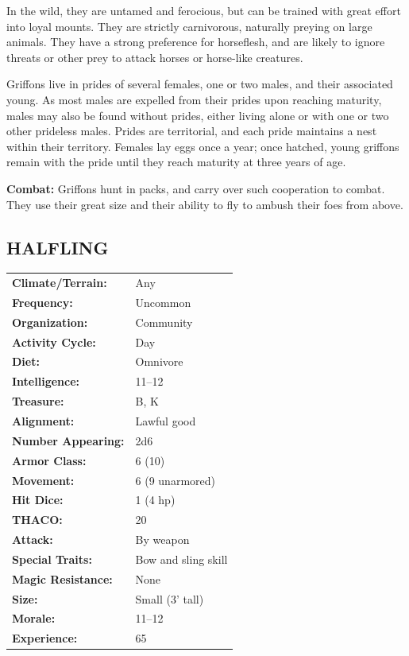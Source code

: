 \begin{multicols}{2}
In the wild, they are untamed and ferocious, but can be trained with great effort into loyal mounts. They are strictly carnivorous, naturally preying on large animals. They have a strong preference for horseflesh, and are likely to ignore threats or other prey to attack horses or horse-like creatures. 

Griffons live in prides of several females, one or two males, and their associated young. As most males are expelled from their prides upon reaching maturity, males may also be found without prides, either living alone or with one or two other prideless males. Prides are territorial, and each pride maintains a nest within their territory. Females lay eggs once a year; once hatched, young griffons remain with the pride until they reach maturity at three years of age.

\textbf{Combat:} Griffons hunt in packs, and carry over such cooperation to combat. They use their great size and their ability to fly to ambush their foes from above.

\noindent \begin{minipage}{\columnwidth}

\vspace{1em}

\subsection{HALFLING}

\noindent \begin{tabular}{p{}p{}}
\textbf{Climate/Terrain:}	& Any \\
\textbf{Frequency:} 		& Uncommon \\
\textbf{Organization:} 		& Community \\
\textbf{Activity Cycle:} 	& Day \\
\textbf{Diet:} 				& Omnivore \\
\textbf{Intelligence:} 		& 11--12 \\
\textbf{Treasure:} 			& B, K \\
\textbf{Alignment:} 		& Lawful good \\
\hline
\textbf{Number Appearing:} 	& 2d6 \\
\textbf{Armor Class:} 		& 6 (10) \\
\textbf{Movement:} 			& 6 (9 unarmored) \\
\textbf{Hit Dice:} 			& 1 (4 hp) \\
\textbf{THACO:} 			& 20 \\
\textbf{Attack:} 			& By weapon \\
\textbf{Special Traits:} & Bow and sling skill  \\
\textbf{Magic Resistance:} 	& None \\
\textbf{Size:} 				& Small (3' tall) \\
\textbf{Morale:} 			& 11--12 \\
\textbf{Experience:} 		& 65 \\ %
\end{tabular}


\end{minipage}
\end{multicols}
